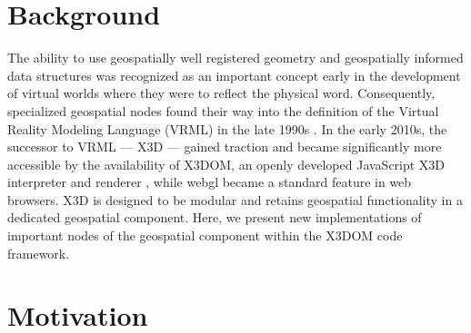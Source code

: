 \documentclass{acmsiggraph}                     %
\begin{document}

\begin{CRcatlist}  \end{CRcatlist}

\keywordlist

\section{Background}

\copyrightspace

The ability to use geospatially well registered geometry and geospatially informed data structures
was recognized as an important concept early in the development of virtual worlds where they were to
reflect the physical word. Consequently, specialized geospatial nodes found their way into the
definition of the Virtual Reality Modeling Language (VRML) in the late 1990s \cite{reddy2000}. In
the early 2010s, the successor to VRML --- X3D --- gained traction and became significantly more
accessible by the availability of X3DOM, an openly developed JavaScript X3D interpreter and renderer
\cite{behr09}, while webgl became a standard feature in web browsers. X3D is designed to be modular
\cite{x3d05} and retains geospatial functionality in a dedicated geospatial component. Here, we
present new implementations of important nodes of the geospatial component within the X3DOM code
framework.


\section{Motivation}
\end{document}
